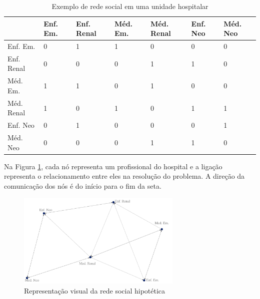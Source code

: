 \begin{table}[htbp]
\centering
\caption{Exemplo de rede social em uma unidade hospitalar}
\label{table:social-network-example}
\begin{tabular}{|l|l|l|l|l|l|l|}
\hline
                                      & Enf. Em. & Enf. Renal & Méd. Em. & Méd. Renal & Enf. Neo & Méd. Neo \\ \hline
Enf. Em.                 & 0                     & 1                                   & 1                 & 0                       & 0                                     & 0                                 \\ \hline
Enf. Renal   & 0                     & 0                                   & 0                 & 1                       & 1                                     & 0                                 \\ \hline
Méd. Em.                     & 1                     & 1                                   & 0                 & 1                       & 0                                     & 0                                 \\ \hline
Méd. Renal               & 1                     & 0                                   & 1                 & 0                       & 1                                     & 1                                 \\ \hline
Enf. Neo & 0                     & 1                                   & 0                 & 0                       & 0                                     & 1                                 \\ \hline
Méd. Neo     & 0                     & 0                                   & 0                 & 1                       & 1                                     & 0                                 \\ \hline
\end{tabular}
\end{table}

Na Figura \ref{fig:social-network-example}, cada nó representa um profissional do hospital e a ligação representa o relacionamento entre eles na resolução do problema. A direção da comunicação dos nós é do início para o fim da seta.

\begin{figure}[htbp]
\centering
 \includegraphics[width=0.7\textwidth]{figuras/rede-exemplo.pdf}
 \caption{Representação visual da rede social hipotética}
\label{fig:social-network-example}
\end{figure}

